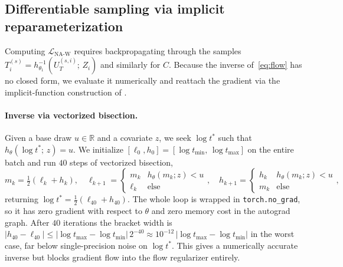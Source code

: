 \subsection{Differentiable sampling via implicit reparameterization}
\label{sec:samp}

Computing $\mathcal{L}_{\text{NA-W}}$ requires backpropagating through the
samples
$T_i^{(s)} = h_{\theta_1}^{-1}(U_T^{(s, i)};\, Z_i)$ and similarly for $C$.
Because the inverse of~\eqref{eq:flow} has no closed form, we evaluate it
numerically and reattach the gradient via the
implicit-function construction of \citet{figurnov2018implicit}.

\paragraph{Inverse via vectorized bisection.}
Given a base draw $u \in \mathbb{R}$ and a covariate $z$, we seek
$\log t^{*}$ such that $h_\theta(\log t^{*};\, z) = u$. We initialize
$[\ell_0, h_0] = [\log t_{\min},\, \log t_{\max}]$ on the entire batch and
run $40$ steps of vectorized bisection,
\[
    m_k = \tfrac{1}{2}(\ell_k + h_k),
    \quad
    \ell_{k+1} = \begin{cases} m_k & h_\theta(m_k; z) < u \\ \ell_k & \text{else}\end{cases},
    \quad
    h_{k+1} = \begin{cases} h_k & h_\theta(m_k; z) < u \\ m_k & \text{else}\end{cases},
\]
returning $\log t^{*} = \tfrac{1}{2}(\ell_{40} + h_{40})$. The whole loop is
wrapped in \texttt{torch.no\_grad}, so it has zero gradient with respect to
$\theta$ and zero memory cost in the autograd graph. After $40$ iterations
the bracket width is $|h_{40} - \ell_{40}| \le |\log t_{\max} - \log t_{\min}|\, 2^{-40}
\approx 10^{-12}\,|\log t_{\max} - \log t_{\min}|$ in the worst case, far below
single-precision noise on $\log t^{*}$. This gives a numerically accurate
inverse but blocks gradient flow into the flow regularizer entirely.

